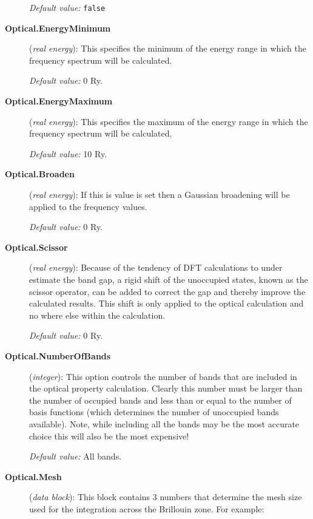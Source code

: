 \documentclass[11pt]{article}
\begin{document}
\begin{description}
{\it Default value:} {\tt false}

\item[{\bf Optical.EnergyMinimum}] ({\it real energy}):
This specifies the minimum of the energy range in which
the frequency spectrum will be calculated.

{\it Default value:} 0 Ry.

\item[{\bf Optical.EnergyMaximum}] ({\it real energy}):
This specifies the maximum of the energy range in which
the frequency spectrum will be calculated.

{\it Default value:} 10 Ry.

\item[{\bf Optical.Broaden}] ({\it real energy}):
If this is value is set then a Gaussian broadening will be
applied to the frequency values.

{\it Default value:} 0 Ry.

\item[{\bf Optical.Scissor}] ({\it real energy}):
Because of the tendency of DFT calculations to under estimate
the band gap, a rigid shift of the unoccupied states, known as 
the scissor operator, can be added to correct the gap and
thereby improve the calculated results. This shift is only
applied to the optical calculation and no where else within
the calculation.

{\it Default value:} 0 Ry.

\item[{\bf Optical.NumberOfBands}] ({\it integer}):
This option controls the number of bands that are included in
the optical property calculation. Clearly this number must be
larger than the number of occupied bands and less than or
equal to the number of basis functions (which determines the
number of unoccupied bands available). Note, while including
all the bands may be the most accurate choice this will also
be the most expensive!

{\it Default value:} All bands.

\item[{\bf Optical.Mesh}] ({\it data block}):
This block contains 3 numbers that determine the mesh size
used for the integration across the Brillouin zone. For
example:


\end{description}
\end{document}
